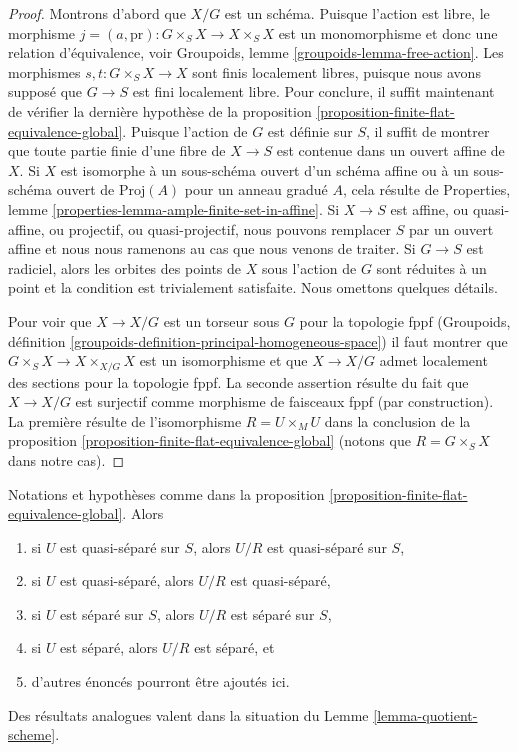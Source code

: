 \begin{proof}
Montrons d'abord que $X/G$ est un schéma. Puisque l'action est libre, le morphisme
$j = (a, \text{pr}) : G \times_S X \to X \times_S X$
est un monomorphisme et donc une relation d'équivalence, voir
Groupoids, lemme \ref{groupoids-lemma-free-action}. Les morphismes
$s, t : G \times_S X \to X$
sont finis localement libres, puisque nous avons supposé que $G \to S$ est fini localement
libre. Pour conclure, il suffit maintenant de vérifier la dernière hypothèse de la
proposition \ref{proposition-finite-flat-equivalence-global}.
Puisque l'action de $G$ est définie sur $S$, il suffit de montrer que
toute partie finie d'une fibre de $X \to S$ est contenue dans un
ouvert affine de $X$. Si $X$ est isomorphe à un sous-schéma ouvert d'un
schéma affine ou à un sous-schéma ouvert de $\text{Proj}(A)$
pour un anneau gradué $A$, cela résulte de
Properties, lemme \ref{properties-lemma-ample-finite-set-in-affine}.
Si $X \to S$ est affine, ou quasi-affine, ou projectif, ou
quasi-projectif, nous pouvons remplacer $S$ par un ouvert affine et nous
nous ramenons au cas que nous venons de traiter. Si $G \to S$ est radiciel,
alors les orbites des points de $X$ sous l'action de $G$ sont réduites à un point
et la condition est trivialement satisfaite. Nous omettons quelques détails.

\medskip\noindent
Pour voir que $X \to X/G$ est un torseur sous $G$ pour la topologie fppf
(Groupoids, définition \ref{groupoids-definition-principal-homogeneous-space})
il faut montrer que $G \times_S X \to X \times_{X/G} X$
est un isomorphisme et que $X \to X/G$ admet localement des sections pour la topologie fppf.
La seconde assertion résulte du fait que $X \to X/G$ est surjectif
comme morphisme de faisceaux fppf (par construction). La première résulte de
l'isomorphisme $R = U \times_M U$ dans la conclusion de la
proposition \ref{proposition-finite-flat-equivalence-global}
(notons que $R = G \times_S X$ dans notre cas).
\end{proof}

\begin{lemma}
\label{lemma-quotient-separated}
Notations et hypothèses comme dans la
proposition \ref{proposition-finite-flat-equivalence-global}. Alors
\begin{enumerate}
\item si $U$ est quasi-séparé sur $S$, alors $U/R$ est quasi-séparé
sur $S$,
\item si $U$ est quasi-séparé, alors $U/R$ est quasi-séparé,
\item si $U$ est séparé sur $S$, alors $U/R$ est séparé sur $S$,
\item si $U$ est séparé, alors $U/R$ est séparé, et
\item d'autres énoncés pourront être ajoutés ici.
\end{enumerate}
Des résultats analogues valent dans la situation du Lemme \ref{lemma-quotient-scheme}.
\end{lemma}

